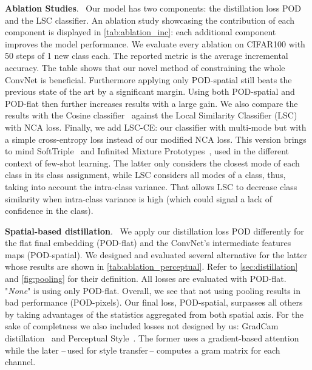 \documentclass[runningheads]{llncs}
\newcommand{\parag}[1]{\vspace{0.2cm}\noindent\textbf{#1}.\ }
\begin{document}
\parag{Ablation Studies}
Our model has two components: the distillation loss POD and the LSC classifier. An ablation study showcasing the contribution of each component is displayed in \autoref{tab:ablation_inc}: each additional component improves the model performance. We evaluate every ablation on CIFAR100 with 50 steps of 1 new class each. The reported metric is the average incremental accuracy. The table shows that our novel method of constraining the whole ConvNet is beneficial. Furthermore applying only POD-spatial still beats the previous state of the art by a significant margin. Using both POD-spatial and POD-flat then further increases results with a large gain. We also compare the results with the Cosine classifier~\cite{luo2018cosine_classifier,hou2019ucir} against the Local Similarity Classifier (LSC) with NCA loss. Finally, we add LSC-CE: our classifier with multi-mode but with a simple cross-entropy loss instead of our modified NCA loss. This version brings to mind SoftTriple~\cite{qian2019softtriple} and Infinited Mixture Prototypes~\cite{allen2019infinitemixtureproto}, used in the different context of few-shot learning.
The latter only considers the closest mode of each class in its class assignment, while LSC considers all modes of a class, thus, taking into account the intra-class variance. That allows LSC to decrease class similarity when intra-class variance is high (which could signal a lack of confidence in the class).

\label{sec:ablation_pooling}
\parag{Spatial-based distillation} We apply our distillation loss POD differently for the flat final embedding  (POD-flat) and the ConvNet's intermediate features maps  (POD-spatial). We designed and evaluated several alternative for the latter whose results are shown in \autoref{tab:ablation_perceptual}. Refer to \autoref{sec:distillation} and \autoref{fig:pooling} for their definition. All losses are evaluated with POD-flat. "\textit{None}" is using only POD-flat.
Overall, we see that not using pooling results in bad performance (POD-pixels). Our final loss, POD-spatial, surpasses all others by taking advantages of the statistics aggregated from both spatial axis. For the sake of completness we also included losses not designed by us: GradCam distillation~\cite{dhar2019learning_without_memorizing_gradcam} and Perceptual Style~\cite{johnson2016perceptual_losses}. The former uses a gradient-based attention while the later --\,used for style transfer\,-- computes a gram matrix for each channel.
\end{document}
